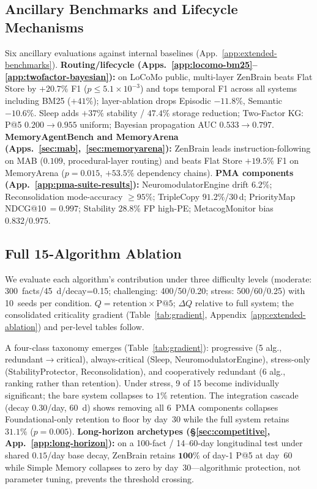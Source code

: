 \documentclass{article}
\begin{document}
\subsection{Ancillary Benchmarks and Lifecycle Mechanisms}
\label{sec:ancillary}

Six ancillary evaluations against internal baselines
(App.~\ref{app:extended-benchmarks}).
\textbf{Routing/lifecycle (Apps.~\ref{app:locomo-bm25}--\ref{app:twofactor-bayesian}):}
on LoCoMo public, multi-layer ZenBrain beats Flat Store by $+20.7\%$
F1 ($p \le 5.1\times 10^{-3}$) and tops temporal F1 across all systems including
BM25 ($+41\%$); layer-ablation drops Episodic $-11.8\%$, Semantic
$-10.6\%$. Sleep adds $+37\%$ stability / $47.4\%$ storage reduction;
Two-Factor KG: P@5 $0.200{\to}0.955$ uniform; Bayesian propagation
AUC $0.533{\to}0.797$.
\textbf{MemoryAgentBench and MemoryArena (Apps.~\ref{sec:mab},~\ref{sec:memoryarena}):}
ZenBrain leads instruction-following on MAB ($0.109$, procedural-layer
routing) and beats Flat Store $+19.5\%$ F1 on MemoryArena
($p{=}0.015$, $+53.5\%$ dependency chains).
\textbf{PMA components (App.~\ref{app:pma-suite-results}):}
NeuromodulatorEngine drift $6.2\%$; Reconsolidation mode-accuracy
$\geq 95\%$; TripleCopy $91.2\%$/30\,d; PriorityMap NDCG@10\,$=0.997$;
Stability $28.8\%$ FP high-PE; MetacogMonitor bias $0.832/0.975$.

\subsection{Full 15-Algorithm Ablation}
\label{sec:full-ablation}

We evaluate each algorithm's contribution under three difficulty levels
(moderate: 300~facts/45~d/decay=0.15; challenging: 400/50/0.20;
stress: 500/60/0.25) with 10~seeds per condition. $Q{=}\text{retention}{\times}\text{P@5}$;
$\Delta Q$ relative to full system; the consolidated criticality
gradient (Table~\ref{tab:gradient},
Appendix~\ref{app:extended-ablation}) and per-level tables follow.

A four-class taxonomy emerges (Table~\ref{tab:gradient}): progressive
(5 alg., redundant$\to$critical), always-critical (Sleep,
NeuromodulatorEngine), stress-only (StabilityProtector, Reconsolidation),
and cooperatively redundant (6 alg., ranking rather than retention).
Under stress, 9 of 15 become individually significant; the bare system
collapses to $1\%$ retention. The integration cascade (decay 0.30/day,
60~d) shows removing all 6~PMA components collapses Foundational-only
retention to floor by day~30 while the full system retains $31.1\%$
($p{=}0.005$). \textbf{Long-horizon archetypes
(\S\ref{sec:competitive}, App.~\ref{app:long-horizon}):} on a
100-fact / 14--60-day longitudinal test under shared $0.15$/day base
decay, ZenBrain retains $\mathbf{100\%}$ of day-1 P@5 at day~60 while
Simple Memory collapses to zero by day~30---algorithmic protection,
not parameter tuning, prevents the threshold crossing.
\end{document}
